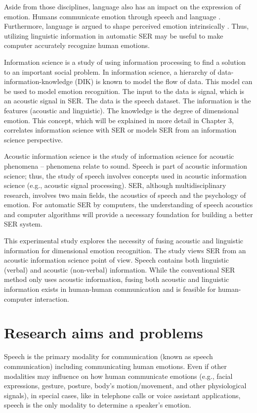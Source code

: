 Aside from those disciplines, language also has an impact on the expression of
emotion. Humans communicate emotion through speech and language
\cite{Kotz2011}. Furthermore,  language is argued to shape perceived emotion
intrinsically \cite{Lindquist2006}. Thus, utilizing linguistic information in
automatic SER may be useful to make computer accurately recognize human
emotions. 

Information science is a study of using information processing to find a
solution to an important social problem. In information science, a hierarchy of
data-information-knowledge (DIK) is known to model the flow of data. This model
can be used to model emotion recognition. The input to the data is signal,
which is an acoustic signal in SER. The data is the speech dataset. The
information is the features (acoustic and linguistic). The knowledge is the
degree of dimensional emotion. This concept, which will be explained in more
detail in Chapter 3, correlates information science with SER or models SER from
an information science perspective. 

Acoustic information science is the study of information science for acoustic
phenomena -- phenomena relate to sound. Speech is part of acoustic information
science; thus, the study of speech involves concepts used in acoustic
information science (e.g., acoustic signal processing). SER, although
multidisciplinary research, involves two main fields, the acoustics of speech
and the psychology of emotion. For automatic SER by computers, the
understanding of speech acoustics and computer algorithms will provide a
necessary foundation for building a better SER system.

This experimental study explores the necessity of fusing acoustic and
linguistic information for dimensional emotion recognition. The study views SER
from an acoustic information science point of view. Speech contains both
linguistic (verbal) and acoustic (non-verbal) information. While the
conventional SER method only uses acoustic information, fusing both acoustic
and linguistic information exists in human-human communication and is feasible
for human-computer interaction.

\section{Research aims and problems}
Speech is the primary modality for communication (known as speech
communication) including communicating human emotions. Even if other modalities
may influence on how human communicate emotions (e.g., facial expressions,
gesture, posture, body's motion/movement, and other physiological signals), in
special cases, like in telephone calls or voice assistant applications, 
speech is the only modality to determine a speaker's emotion.

